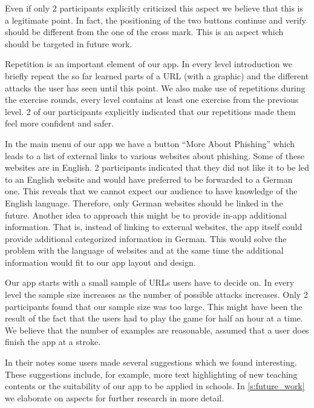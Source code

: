 \begin{description}[leftmargin=0cm]
Even if only 2 participants explicitly criticized this aspect we believe that this is a legitimate point.
In fact, the positioning of the two buttons continue and verify should be different from the one of the cross mark.
This is an aspect which should be targeted in future work. 
	\item[Repetition:]
Repetition is an important element of our app.
In every level introduction we briefly repeat the so far learned parts of a URL (with a graphic) and the different attacks the user has seen until this point.
We also make use of repetitions during the exercise rounds, every level contains at least one exercise from the previous level.
2 of our participants explicitly indicated that our repetitions made them feel more confident and safer.
	\item[External Links:]
In the main menu of our app we have a button ``More About Phishing'' which leads to a list of external links to various websites about phishing.
Some of these websites are in English.
2 participants indicated that they did not like it to be led to an English website and would have preferred to be forwarded to a German one.
This reveals that we cannot expect our audience to have knowledge of the English language.
Therefore, only German websites should be linked in the future.
Another idea to approach this might be to provide in-app additional information.
That is, instead of linking to external websites, the app itself could provide additional categorized information in German.
This would solve the problem with the language of websites and at the same time the additional information would fit to our app layout and design.
	\item[Amount of Examples:] Our app starts with a small sample of URLs users have to decide on.
In every level the sample size increases as the number of possible attacks increases.
Only 2 participants found that our sample size was too large.
This might have been the result of the fact that the users had to play the game for half an hour at a time.
We believe that the number of examples are reasonable, assumed that a user does finish the app at a stroke.
	\item[Further Suggestions:] In their notes some users made several suggestions which we found interesting.
These suggestions include, for example, more text highlighting of new teaching contents or the suitability of our app to be applied in schools.
In \autoref{s:future_work} we elaborate on aspects for further research in more detail.
\end{description}

